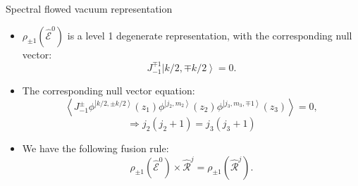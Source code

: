 \documentclass{beamer}
\newcommand{\ket}[1]{\left| #1 \right\rangle}
\newcommand{\vev}[1]{\left\langle #1 \right\rangle}
\begin{document}
\begin{frame}{Spectral flowed vacuum representation}
  \begin{itemize}
    \item $\rho_{\pm 1} \left(\widehat{\mathcal{E}}^{0}\right)$ is a level 1 degenerate representation, with the corresponding null vector:
      \begin{equation*}
        J^{\mp 1}_{-1} \ket{k/2,\mp k/2} = 0.
      \end{equation*}
    \item The corresponding null vector equation:
      \begin{equation*}
          \vev{J^{\pm}_{-1} \phi^{\ket{k/2,\pm k/2 } }(z_{1} ) \phi ^{\ket{j_{2},m_{2}}} ( z_{2})
            \phi ^{\ket{j_{3},m_{3}, \mp 1}} ( z_{3} ) }= 0,
      \end{equation*}
      \begin{equation*}
          \Longrightarrow j_{2}(j_{2}+1) = j_{3}(j_{3}+1)
      \end{equation*}
    \item We have the following fusion rule:
      \begin{equation*}
          \rho_{\pm 1} \left( \widehat{\mathcal{E}}^{0} \right) \times \widehat{\mathcal{R}}^{j} = \rho_{\pm 1} \left( \widehat{\mathcal{R}}^{j} \right).
      \end{equation*}
  \end{itemize}
\end{frame}
\end{document}
